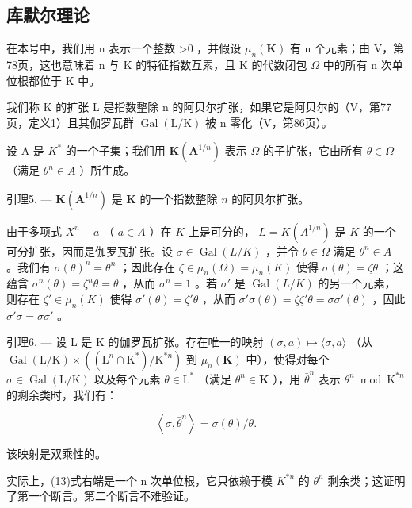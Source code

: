 \subsection{库默尔理论}

在本号中，我们用 n 表示一个整数 \textgreater0 ，并假设 \(\mu_{n}(\mathbf{K})\) 有 n 个元素；由 V，第78页，这也意味着 n 与 K 的特征指数互素，且 K 的代数闭包 \(\Omega\) 中的所有 n 次单位根都位于 K 中。

我们称 K 的扩张 L 是指数整除 n 的阿贝尔扩张，如果它是阿贝尔的（V，第77页，定义1）且其伽罗瓦群 \(\operatorname{Gal}(\mathrm{L}/\mathrm{K})\) 被 n 零化（V，第86页）。

设 A 是 \(K^{*}\) 的一个子集；我们用 \(\mathbf{K}(\mathbf{A}^{1/n})\) 表示 \(\Omega\) 的子扩张，它由所有 \(\theta \in \Omega\) （满足 \(\theta^{n} \in A\) ）所生成。

引理5. --- \(\mathbf{K}(\mathbf{A}^{1 / n})\) 是 \(\mathbf{K}\) 的一个指数整除 \(n\) 的阿贝尔扩张。

由于多项式 \(X^n - a\) （ \(a \in A\) ）在 \(K\) 上是可分的， \(L = K(A^{1/n})\) 是 \(K\) 的一个可分扩张，因而是伽罗瓦扩张。设 \(\sigma \in \operatorname{Gal}(L/K)\) ，并令 \(\theta \in \Omega\) 满足 \(\theta^n \in A\) 。我们有 \(\sigma(\theta)^n = \theta^n\) ；因此存在 \(\zeta \in \mu_n(\Omega) = \mu_n(K)\) 使得 \(\sigma(\theta) = \zeta\theta\) ；这蕴含 \(\sigma^n(\theta) = \zeta^n\theta = \theta\) ，从而 \(\sigma^n = 1\) 。若 \(\sigma'\) 是 \(\operatorname{Gal}(L/K)\) 的另一个元素，则存在 \(\zeta' \in \mu_n(K)\) 使得 \(\sigma'(\theta) = \zeta'\theta\) ，从而 \(\sigma' \sigma(\theta) = \zeta\zeta'\theta = \sigma\sigma'(\theta)\) ，因此 \(\sigma' \sigma = \sigma\sigma'\) 。

引理6. --- 设 L 是 K 的伽罗瓦扩张。存在唯一的映射 \((\sigma, a) \mapsto \langle \sigma, a \rangle\) （从 \(\operatorname{Gal}(\mathrm{L} / \mathrm{K}) \times ((\mathrm{L}^n \cap \mathrm{K}^*) / \mathrm{K}^{*n})\) 到 \(\mu_n(\mathbf{K})\) 中），使得对每个 \(\sigma \in \operatorname{Gal}(\mathrm{L} / \mathrm{K})\) 以及每个元素 \(\theta \in \mathrm{L}^*\) （满足 \(\theta^n \in \mathbf{K}\) ），用 \(\bar{\theta}^n\) 表示 \(\theta^n \bmod \mathrm{K}^{*n}\) 的剩余类时，我们有：

\[
\left\langle \sigma , \bar {\theta} ^ {n} \right\rangle = \sigma (\theta) / \theta .\tag{13}
\]

该映射是双乘性的。

实际上，(13)式右端是一个 n 次单位根，它只依赖于模 \(K^{*n}\) 的 \(\theta^{n}\) 剩余类；这证明了第一个断言。第二个断言不难验证。

